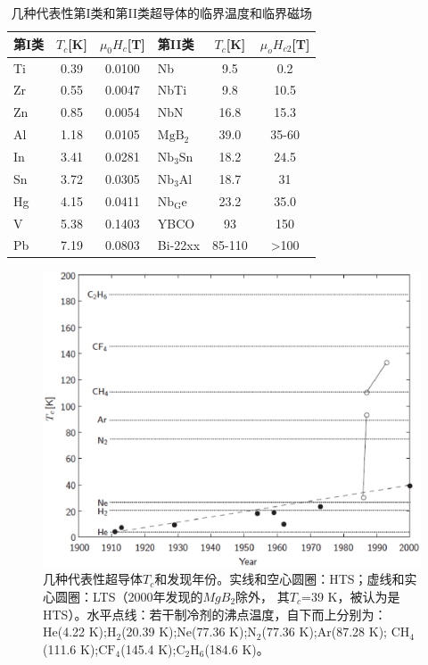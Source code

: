 \begin{table}[htbp]\small%
  \centering
  \caption{几种代表性第I类和第II类超导体的临界温度和临界磁场} \label{criticalparameters}
  \begin{tabular}{|l|c|c||l|c|c|}
    \hline
    第I类 & $T_c$[K] & $\mu_0 H_c$[T] & 第II类 & $T_c$[K] & $\mu_o H_{c2}$[T] \\ \hline \hline
    Ti & 0.39 & 0.0100 & Nb & 9.5 & 0.2 \\ \hline
    Zr & 0.55 & 0.0047 & NbTi & 9.8 & 10.5 \\ \hline
    Zn & 0.85 & 0.0054 &NbN & 16.8 & 15.3 \\ \hline
    Al & 1.18 & 0.0105&$\mathrm{MgB_2}$ & 39.0 & 35-60\\ \hline
    In & 3.41 & 0.0281 & $\mathrm{Nb_3Sn}$ & 18.2 & 24.5  \\ \hline
    Sn & 3.72 & 0.0305  & $\mathrm{Nb_3Al}$ & 18.7 & 31\\ \hline
    Hg & 4.15 & 0.0411  & $\mathrm{Nb_Ge}$ & 23.2 & 35.0\\ \hline
    V & 5.38 & 0.1403& YBCO & 93 & 150\\ \hline
    Pb & 7.19 & 0.0803 & Bi-22xx & 85-110 & >100 \\
    \hline
  \end{tabular}
\end{table}


\begin{figure}%
  \centering
 \includegraphics[scale=0.6]{chpt1/figs/fig1.4.eps}
  \caption{
几种代表性超导体$T_c$和发现年份。实线和空心圆圈：HTS；虚线和实心圆圈：LTS（2000年发现的$MgB_2$除外，
其$	T_c$=39 K，被认为是HTS）。水平点线：若干制冷剂的沸点温度，自下而上分别为：
He(4.22 K);$\mathrm{H_2}$(20.39 K);Ne(77.36 K);$\mathrm{N_2}$(77.36 K);Ar(87.28 K);
$\mathrm{CH_4}$(111.6 K);$\mathrm{CF_4}$(145.4 K);$\mathrm{C_2H_6}$(184.6 K)。
}
\end{figure}


